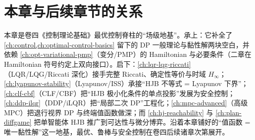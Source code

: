 \section*{本章与后续章节的关系}
本章是卷四《控制理论基础》最优控制脊柱的“场级地基”。承上：它补全了 \cref{ch:control,ch:optimal-control-basics} 留下的 DP 一般理论与黏性解两块空白，并依赖 \cref{ch:opt-variational-pmp}（变分/PMP）的 Hamiltonian 与必要条件（二章在 Hamiltonian 符号约定上双向接口）。启下：\cref{ch:lqr-lqg-riccati}（LQR/LQG/Riccati 深化）接手完整 Riccati、确定性等价与时域 $H_\infty$；\cref{ch:lyapunov-stability}（Lyapunov/ISS）承接“HJB 不等式 = Lyapunov 下界”；\cref{ch:clf-cbf}（CLF/CBF）把“HJB 极小化条件的单点投影”发展为安全控制；\cref{ch:ddp-ilqr}（DDP/iLQR）把“局部二次 DP”工程化；\cref{ch:mpc-advanced}（高级 MPC）把退行视界 DP 与终端值函数做深；而 \cref{ch:hj-reachability} 与 \cref{ch:plan-diffgame} 把单智能体 HJB 推广到可达性与微分博弈。沿着本章铺好的“值函数 = 唯一黏性解”这一地基，最优、鲁棒与安全控制在卷四后续诸章次第展开。
